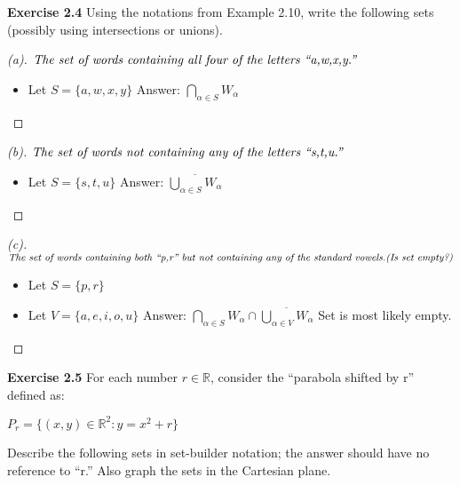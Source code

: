 \documentclass[12pt,oneside]{article}
\newenvironment{exercise}[1]{\vspace{.1in}\noindent\textbf{Exercise #1 \hspace{.05em}}}{}
\newcommand{\R}{\mathbb{R}}
\begin{document}

\begin{exercise}{2.4}
Using the notations from Example 2.10, write the following sets (possibly using intersections or unions).

\end{exercise}

\begin{proof}[(a)]
$\emph{The set of words containing all four of the letters “a,w,x,y.”}$
\begin{itemize}
    
\item[] Let $S = \{a, w, x, y\}$
\subitem Answer: $\bigcap_{\alpha \in S} W_{\alpha}$
\end{itemize}
\end{proof}

\begin{proof}[(b)]
$\emph{The set of words not containing any of the letters “s,t,u.”}$
\begin{itemize}
\item[] Let $S = \{s,t,u\}$
\subitem Answer: $\overline{\bigcup_{\alpha \in S} W_{\alpha}}$
\end{itemize}
\end{proof}

\begin{proof}[(c)]
$\emph{The set of words containing both “p,r” but not containing any of the standard vowels.} \\ \emph{(Is set empty?)}$
\begin{itemize}
    

\item[] Let $S = \{p,r\}$
\item[] Let $V = \{a,e,i,o,u\}$
\subitem Answer: $\bigcap_{\alpha \in S}W_{\alpha} \cap \overline{\bigcup_{\alpha \in V} W_{\alpha}}$   Set is most likely empty.

\end{itemize}
\end{proof}




\begin{exercise}{2.5}
For each number $r \in \R$, consider the “parabola shifted by r” defined
as:

\begin{center}
$P_r = \{(x,y) \in \R^2: y = x^2 + r\}$
\end{center}

Describe the following sets in set-builder notation; the answer should have no reference to “r.” Also graph the sets in the Cartesian plane.

\end{exercise}
\end{document}
